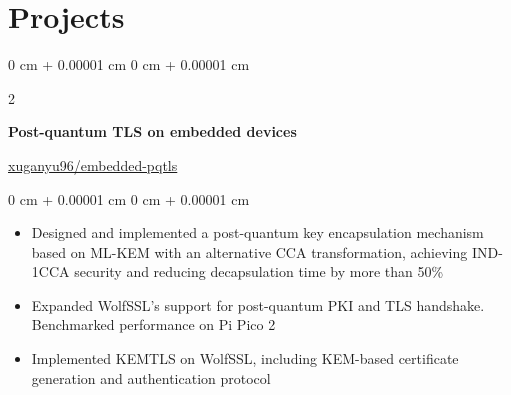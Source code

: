 \documentclass[10pt, letterpaper]{article}
\newenvironment{highlights}{
    \begin{itemize}[
        topsep=0.10 cm,
        parsep=0.10 cm,
        partopsep=0pt,
        itemsep=0pt,
        leftmargin=0 cm + 10pt
    ]
}{
    \end{itemize}
} %
\newenvironment{onecolentry}{
    \begin{adjustwidth}{
        0 cm + 0.00001 cm
    }{
        0 cm + 0.00001 cm
    }
}{
    \end{adjustwidth}
} %
\newenvironment{twocolentry}[2][]{
    \onecolentry
    \def\secondColumn{#2}
    \setcolumnwidth{\fill, 4.5 cm}
    \begin{paracol}{2}
}{
    \switchcolumn \raggedleft \secondColumn
    \end{paracol}
    \endonecolentry
} %
\begin{document}


    
    \section{Projects}
        \begin{twocolentry}
            {\href{https://github.com/xuganyu96/embedded-pqtls}{xuganyu96/embedded-pqtls}}
            {\bf Post-quantum TLS on embedded devices}
        \end{twocolentry}
        \vspace{0.1cm}
        \begin{onecolentry}
            \begin{highlights}
                \item Designed and implemented a post-quantum key encapsulation mechanism based on ML-KEM with an alternative CCA transformation, achieving IND-1CCA security and reducing decapsulation time by more than 50\%
                \item Expanded WolfSSL's support for post-quantum PKI and TLS handshake. Benchmarked performance on Pi Pico 2
                \item Implemented KEMTLS on WolfSSL, including KEM-based certificate generation and authentication protocol
            \end{highlights}
        \end{onecolentry}
        \vspace{0.3cm}
\end{document}
